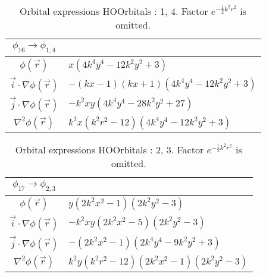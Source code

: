 \begin{table}
\begin{center}
\begin{tabular}{c|l}
$\phi_{16} \rightarrow \phi_{1, 4}$\\
\hline
$\phi(\vec r)$ & $x \left(4 k^{4} y^{4} - 12 k^{2} y^{2} + 3\right)$\\
\hline
$\vec i\cdot \nabla \phi(\vec r)$ & $- \left(k x -1\right) \left(k x + 1\right) \left(4 k^{4} y^{4} - 12 k^{2} y^{2} + 3\right)$\\
$\vec j\cdot \nabla \phi(\vec r)$ & $- k^{2} x y \left(4 k^{4} y^{4} - 28 k^{2} y^{2} + 27\right)$\\
\hline
$\nabla^2 \phi(\vec r)$ & $k^{2} x \left(k^{2} r^{2} -12\right) \left(4 k^{4} y^{4} - 12 k^{2} y^{2} + 3\right)$\\
\end{tabular}
\caption{Orbital expressions HOOrbitals : 1, 4. Factor $e^{- \frac{1}{2} k^{2} r^{2}}$ is omitted.}
\end{center}
\end{table}


\begin{table}
\begin{center}
\begin{tabular}{c|l}
$\phi_{17} \rightarrow \phi_{2, 3}$\\
\hline
$\phi(\vec r)$ & $y \left(2 k^{2} x^{2} -1\right) \left(2 k^{2} y^{2} -3\right)$\\
\hline
$\vec i\cdot \nabla \phi(\vec r)$ & $- k^{2} x y \left(2 k^{2} x^{2} -5\right) \left(2 k^{2} y^{2} -3\right)$\\
$\vec j\cdot \nabla \phi(\vec r)$ & $- \left(2 k^{2} x^{2} -1\right) \left(2 k^{4} y^{4} - 9 k^{2} y^{2} + 3\right)$\\
\hline
$\nabla^2 \phi(\vec r)$ & $k^{2} y \left(k^{2} r^{2} -12\right) \left(2 k^{2} x^{2} -1\right) \left(2 k^{2} y^{2} -3\right)$\\
\end{tabular}
\caption{Orbital expressions HOOrbitals : 2, 3. Factor $e^{- \frac{1}{2} k^{2} r^{2}}$ is omitted.}
\end{center}
\end{table}


